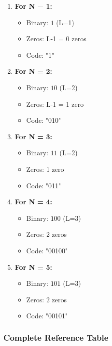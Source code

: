 \begin{enumerate}
    \item \textbf{For N = 1:}
    \begin{itemize}
        \item Binary: $1$ (L=1)
        \item Zeros: L-1 = 0 zeros
        \item Code: "1"
    \end{itemize}
    
    \item \textbf{For N = 2:}
    \begin{itemize}
        \item Binary: $10$ (L=2)
        \item Zeros: L-1 = 1 zero
        \item Code: "010"
    \end{itemize}
    
    \item \textbf{For N = 3:}
    \begin{itemize}
        \item Binary: $11$ (L=2)
        \item Zeros: 1 zero
        \item Code: "011"
    \end{itemize}
    
    \item \textbf{For N = 4:}
    \begin{itemize}
        \item Binary: $100$ (L=3)
        \item Zeros: 2 zeros
        \item Code: "00100"
    \end{itemize}
    
    \item \textbf{For N = 5:}
    \begin{itemize}
        \item Binary: $101$ (L=3)
        \item Zeros: 2 zeros
        \item Code: "00101"
    \end{itemize}
\end{enumerate}

\subsubsection*{Complete Reference Table}

